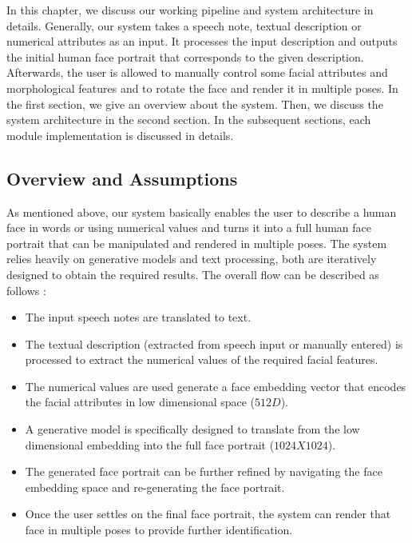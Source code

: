 In this chapter, we discuss our working pipeline and system architecture in details.  Generally, our system takes a speech note, textual description or numerical attributes as an input. It processes the input description and outputs the initial human face portrait that corresponds to the given description. Afterwards, the user is allowed to manually control some facial attributes and morphological features and to rotate the face and render it in multiple poses. In the first section, we give an overview about the system. Then, we discuss the system architecture in the second section. In the subsequent sections, each module implementation is discussed in details.

\subsection{Overview and Assumptions}

As mentioned above, our system basically enables the user to describe a human face in words or using numerical values and turns it into a full human face portrait that can be manipulated and rendered in multiple poses. The system relies heavily on generative models and text processing, both are iteratively designed to obtain the required results. The overall flow can be described as follows :
\begin{itemize}
    \item The input speech notes are translated to text.
    \item The textual description (extracted from speech input or manually entered) is processed to extract the numerical values of the required facial features.
    \item The numerical values are used generate a face embedding vector that encodes the facial attributes in low dimensional space ($512D$).
    \item A generative model is specifically designed to translate from the low dimensional embedding into the full face portrait ($1024X1024$).
    \item The generated face portrait can be further refined by navigating the face embedding space and re-generating the face portrait.
    \item Once the user settles on the final face portrait, the system can render that face in multiple poses to provide further identification.
\end{itemize}

